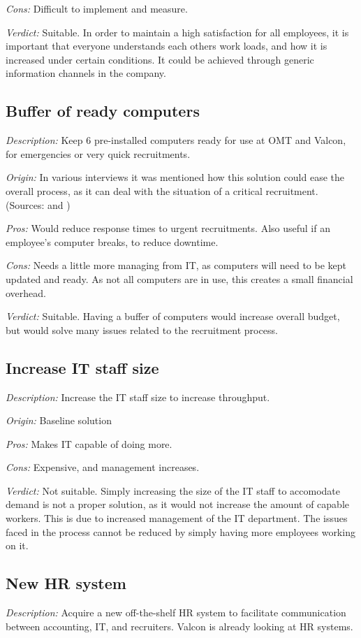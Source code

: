  \emph{Cons:} Difficult to implement and measure. 

\emph{Verdict:}
Suitable. In order to maintain a high satisfaction for all employees, it is important that everyone understands each others work loads, and how it is increased under certain conditions. It could be achieved through generic information channels in the company.

\subsection{Buffer of ready computers}
\emph{Description:} Keep 6 pre-installed computers ready for use at OMT and Valcon, for emergencies or very quick recruitments.

\emph{Origin:}
In various interviews it was mentioned how this solution could ease the overall process, as it can deal with the situation of a critical recruitment.
(Sources:  and )

 \emph{Pros:} Would reduce response times to urgent recruitments.
Also useful if an employee's computer breaks, to reduce downtime.

 \emph{Cons:} Needs a little more managing from IT, as
computers will need to be kept updated and ready.
As not all computers are in use, this creates a small financial overhead.

\emph{Verdict:}
Suitable. Having a buffer of computers would increase overall budget, but would solve many issues related to the recruitment process.

\subsection{Increase IT staff size}
\emph{Description:} Increase the IT staff size to increase throughput.

\emph{Origin:}
Baseline solution

 \emph{Pros:} Makes IT capable of doing more.

 \emph{Cons:} Expensive, and management increases.

\emph{Verdict:}
Not suitable. Simply increasing the size of the IT staff to accomodate demand is not a proper solution, as it would not increase the amount of capable workers. This is due to increased management of the IT department. The issues faced in the process cannot be reduced by simply having more employees working on it.

\subsection{New HR system}
\emph{Description:} Acquire a new off-the-shelf HR system to facilitate communication between accounting, IT, and recruiters.
Valcon is already looking at HR systems.

